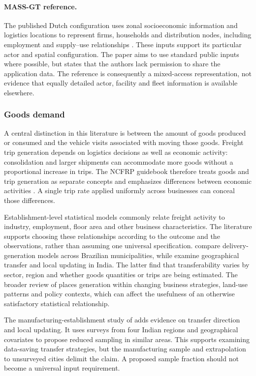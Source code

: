 \paragraph{MASS-GT reference.}
The published Dutch configuration uses zonal socioeconomic information and
logistics locations to represent firms, households and distribution nodes,
including employment and supply--use relationships \parencite{massgt2025}.
These inputs support its particular actor and spatial configuration. The paper
aims to use standard public inputs where possible, but states that the authors
lack permission to share the application data. The reference is consequently
a mixed-access representation, not evidence that equally detailed actor,
facility and fleet information is available elsewhere.


\subsubsection{Goods demand}\label{sec:f2}
A central distinction in this literature is between the amount of goods produced
or consumed and the vehicle visits associated with moving those goods. Freight
trip generation depends on logistics decisions as well as economic activity:
consolidation and larger shipments can accommodate more goods without a
proportional increase in trips. The NCFRP guidebook therefore treats goods and
trip generation as separate concepts and emphasizes differences between economic
activities \parencite{ncfrp2012}. A single trip rate applied uniformly across
businesses can conceal those differences.

Establishment-level statistical models commonly relate freight activity to
industry, employment, floor area and other business characteristics. The
literature supports choosing these relationships according to the outcome and
the observations, rather than assuming one universal specification.
\Textcite{oliveira2022} compare delivery-generation models across Brazilian
municipalities, while \textcite{pani2021} examine geographical transfer and local
updating in India. The latter find that transferability varies by sector, region
and whether goods quantities or trips are being estimated. The broader review of
\textcite{mcleod2019} places generation within changing business strategies,
land-use patterns and policy contexts, which can affect the usefulness of an
otherwise satisfactory statistical relationship.

The manufacturing-establishment study of \textcite{balla2023} adds evidence on
transfer direction and local updating. It uses surveys from four Indian regions
and geographical covariates to propose reduced sampling in similar areas.
This supports examining data-saving transfer strategies, but the manufacturing
sample and extrapolation to unsurveyed cities delimit the claim. A proposed
sample fraction should not become a universal input requirement.

